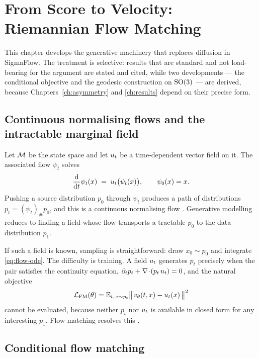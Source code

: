 \chapter{From Score to Velocity: Riemannian Flow Matching}
\label{ch:theory}

This chapter develops the generative machinery that replaces diffusion in
SigmaFlow. The treatment is selective: results that are standard and not
load-bearing for the argument are stated and cited, while two developments
--- the conditional objective and the geodesic construction on $\mathrm{SO}(3)$ ---
are derived, because Chapters~\ref{ch:asymmetry} and \ref{ch:results} depend
on their precise form.

\section{Continuous normalising flows and the intractable marginal field}

Let $\mathcal{M}$ be the state space and let $u_t$ be a time-dependent vector
field on it. The associated flow $\psi_t$ solves
\begin{equation}
  \frac{\mathrm{d}}{\mathrm{d} t}\psi_t(x) \;=\; u_t\bigl(\psi_t(x)\bigr),
  \qquad \psi_0(x) = x .
  \label{eq:flow-ode}
\end{equation}
Pushing a source distribution $p_0$ through $\psi_t$ produces a path of
distributions $p_t = (\psi_t)_\# p_0$, and this is a continuous normalising
flow \citep{chen2018neural}. Generative modelling reduces to finding a field
whose flow transports a tractable $p_0$ to the data distribution $p_1$.

If such a field is known, sampling is straightforward: draw $x_0 \sim p_0$ and
integrate \eqref{eq:flow-ode}. The difficulty is training. A field
$u_t$ generates $p_t$ precisely when the pair satisfies the continuity
equation, $\partial_t p_t + \nabla\!\cdot\!(p_t\,u_t) = 0$, and the
natural objective
\begin{equation}
  \mathcal{L}_{\mathrm{FM}}(\theta)
  = \mathbb{E}_{t,\,x \sim p_t}\bigl\|\,v_\theta(t,x) - u_t(x)\,\bigr\|^2
  \label{eq:fm-loss}
\end{equation}
cannot be evaluated, because neither $p_t$ nor $u_t$ is available in
closed form for any interesting $p_1$. Flow matching resolves this
\citep{lipman2023flow}.

\section{Conditional flow matching}
\label{sec:cfm}


